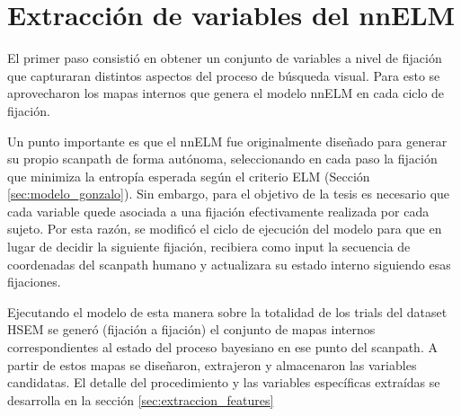\section{Extracción de variables del nnELM}

El primer paso consistió en obtener un conjunto de variables a nivel de fijación que capturaran distintos aspectos del proceso de búsqueda visual. Para esto se aprovecharon los mapas internos que genera el modelo nnELM en cada ciclo de fijación.

Un punto importante es que el nnELM fue originalmente diseñado para generar su propio scanpath de forma autónoma, seleccionando en cada paso la fijación que minimiza la entropía esperada según el criterio ELM (Sección \ref{sec:modelo_gonzalo}). Sin embargo, para el objetivo de la tesis es necesario que cada variable quede asociada a una fijación efectivamente realizada por cada sujeto. Por esta razón, se modificó el ciclo de ejecución del modelo para que en lugar de decidir la siguiente fijación, recibiera como input la secuencia de coordenadas del scanpath humano y actualizara su estado interno siguiendo esas fijaciones.

Ejecutando el modelo de esta manera sobre la totalidad de los trials del dataset HSEM se generó (fijación a fijación) el conjunto de mapas internos correspondientes al estado del proceso bayesiano en ese punto del scanpath. A partir de estos mapas se diseñaron, extrajeron y almacenaron las variables candidatas. El detalle del procedimiento y las variables específicas extraídas se desarrolla en la sección \ref{sec:extraccion_features}